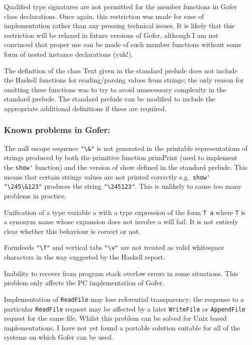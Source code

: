 \IT  Qualified  type  signatures  are  not  permitted  for  the  member
     functions  in  Gofer  class  declarations.    Once   again,   this
     restriction was made for ease of implementation  rather  than  any
     pressing technical issues.  It is  likely  that  this  restriction
     will be relaxed in future versions of Gofer,  although  I  am  not
     convinced that proper use can be made  of  such  member  functions
     without some form of nested instance declarations (yuk!).

\IT  The definition of the class Text given  in  the  standard  prelude
     does not include the Haskell functions for reading/parsing  values
     from strings; the only reason for omitting these functions was  to
     try to  avoid unnecessary complexity in the standard prelude.  The
     standard prelude  can  be  modified  to  include  the  appropriate
     additional definitions if these are required.
\EI

\subsubsection*{Known problems in Gofer:}
\BI
\IT  The null escape sequence \verb="\&"= is not generated  in  the  printable
     representations of strings produced by both the primitive function
     primPrint (used to implement the \verb"show'" function) and  the  version
     of show defined in the standard prelude.  This means that  certain
     strings values are  not printed correctly  e.g.\  
     \verb=show' "\245\&123"=
     produces the string \verb="\245123"=.  This is unlikely to cause too many
     problems in practice.

\IT  Unification of a type variable a with a  type  expression  of  the
     form \verb"T a" where \verb"T" 
     is  a  synonym  name  whose  expansion  does  not
     involve a will fail.   It  is  not  entirely  clear  whether  this
     behaviour is correct or not.

\IT  Formfeeds \verb="\f"= and vertical 
     tabs \verb="\v"= are  not  treated  as  valid
     whitespace characters in the way suggested by the Haskell  report.

\IT  Inability to recover from program stack  overlow  errors  in  some
     situations.  This problem only affects the  PC  implementation  of
     Gofer.

\IT  Implementation of \verb"ReadFile" may lose referential transparency; the
     response to a particular \verb"ReadFile" request may  be  affected  by  a
     later \verb"WriteFile" or \verb"AppendFile" 
     request for the same  file.   Whilst
     this problem can be solved for Unix based implementations, I  have
     not yet found a portable solution suitable for all of the  systems
     on which Gofer can be used.
\EI


